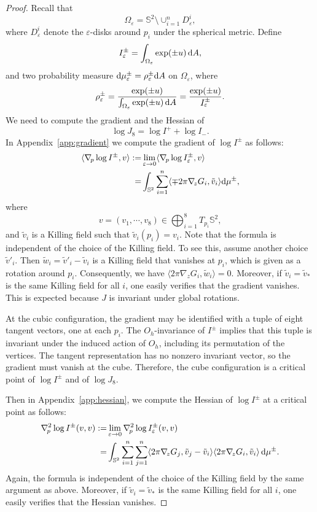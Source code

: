 \documentclass[a4paper]{amsart}
\newcommand{\uS}{\mathbb{S}}
\newcommand{\Hess}{\nabla^2}
\newcommand{\dd}{{\rm d}}
\theoremstyle{plain} %
\theoremstyle{definition} %
\theoremstyle{remark}
\begin{document}
\begin{proof}
	Recall that
	\[
		\Omega_\varepsilon = \uS^2 \setminus \cup_{i=1}^n D^i_\varepsilon,
	\]
	where $D^i_\varepsilon$ denote the $\varepsilon$-disks around $p_i$ under the
	spherical metric.  Define
	\[
		I^\pm_\varepsilon = \int_{\Omega_\varepsilon} \exp(\pm u) \, \dd A,
	\]
	and two probability measure $\dd\mu^\pm_\varepsilon = \rho^\pm_\varepsilon \dd
	A$ on $\Omega_\varepsilon$, where
	\[
		\rho_\varepsilon^\pm
		= \frac{\exp(\pm u)}{\int_{\Omega_\varepsilon} \exp(\pm u) \, \dd A}
		= \frac{\exp(\pm u)}{I^\pm_\varepsilon}.
	\]
	We need to compute the gradient and the Hessian of
	\[
		\log J_8 = \log I^+ + \log I_-.
	\]
	In Appendix~\ref{app:gradient} we compute the gradient of $\log I^\pm$ as
	follows:
	\begin{align}
		\langle \nabla_{\! p} \log I^\pm, v\rangle :=&
		\lim_{\varepsilon\to 0}\langle \nabla_{\! p} \log I^\pm_\varepsilon, v\rangle \nonumber\\
		=& \int_{\uS^2} \sum_{i=1}^n \langle \mp 2\pi \nabla_{\! z} G_i, \tilde v_i \rangle \dd\mu^\pm,\label{eq:gradient}
	\end{align}
	where
	\[
		v = (v_1, \cdots, v_8) \in \bigoplus_{i=1}^8 T_{p_i} \uS^2,
	\]
	and $\tilde v_i$ is a Killing field such that $\tilde v_i (p_i) = v_i$.  Note
	that the formula is independent of the choice of the Killing field.  To see
	this, assume another choice $\tilde v'_i$.  Then $\tilde w_i = \tilde v'_i -
	\tilde v_i$ is a Killing field that vanishes at $p_i$, which is given as a
	rotation around $p_i$.  Consequently, we have $\langle 2\pi \nabla_{\!  z}
	G_i, \tilde w_i \rangle = 0$.  Moreover, if $\tilde v_i = \tilde v_*$ is the
	same Killing field for all $i$, one easily verifies that the gradient
	vanishes.  This is expected because $J$ is invariant under global rotations.

	At the cubic configuration, the gradient may be identified with a tuple of
	eight tangent vectors, one at each $p_i$. The $O_h$-invariance of $I^\pm$
	implies that this tuple is invariant under the induced action of $O_h$,
	including its permutation of the vertices. The tangent representation has no
	nonzero invariant vector, so the gradient must vanish at the cube.
	Therefore, the cube configuration is a critical point of $\log I^\pm$ and of
	$\log J_8$.

	Then in Appendix~\ref{app:hessian}, we compute the Hessian of $\log I^\pm$ at
	a critical point as follows:
	\begin{align}
		\Hess_{\! p} \log I^\pm (v, v)
		:=& \lim_{\varepsilon \to 0} \Hess_{\! p} \log I^\pm_\varepsilon (v, v) \nonumber\\
		=& \int_{\uS^2} \sum_{i=1}^n \sum_{j=1}^n \langle 2\pi \nabla_{\! z} G_j, \tilde v_j - \tilde v_i \rangle \langle 2\pi \nabla_{\! z} G_i, \tilde v_i \rangle \, \dd \mu^\pm.\label{eq:hessian}
	\end{align}
	Again, the formula is independent of the choice of the Killing field by the
	same argument as above.  Moreover, if $\tilde v_i = \tilde v_*$ is the same
	Killing field for all $i$, one easily verifies that the Hessian vanishes.


\end{proof}
\end{document}
